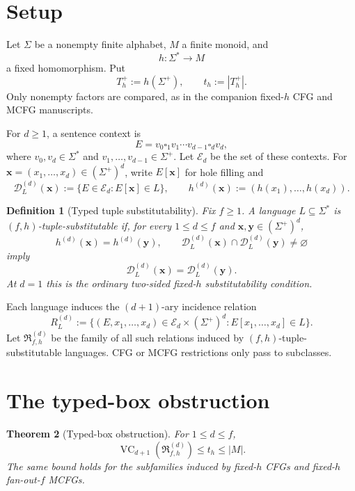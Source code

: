 \documentclass[11pt]{article}
\newtheorem{theorem}{Theorem}[section]
\newtheorem{definition}[theorem]{Definition}
\newcommand{\D}{\mathcal D}
\newcommand{\E}{\mathcal E}
\newcommand{\Rclass}{\mathfrak R}
\newcommand{\VC}{\operatorname{VC}}
\newcommand{\blank}{\square}
\begin{document}
\section{Setup}

Let \(\Sigma\) be a nonempty finite alphabet, \(M\) a finite monoid, and
\[
h:\Sigma^*\to M
\]
a fixed homomorphism. Put
\[
T_h^+:=h(\Sigma^+),\qquad t_h:=|T_h^+|.
\]
Only nonempty factors are compared, as in the companion fixed-\(h\) CFG and MCFG manuscripts.

For \(d\ge1\), a sentence context is
\[
E=v_0\blank_1v_1\cdots v_{d-1}\blank_dv_d,
\]
where \(v_0,v_d\in\Sigma^*\) and \(v_1,\ldots,v_{d-1}\in\Sigma^+\).
Let \(\E_d\) be the set of these contexts. For
\(\mathbf x=(x_1,\ldots,x_d)\in(\Sigma^+)^d\), write \(E[\mathbf x]\) for
hole filling and
\[
\D_L^{(d)}(\mathbf x):=\{E\in\E_d:E[\mathbf x]\in L\},\qquad
h^{(d)}(\mathbf x):=(h(x_1),\ldots,h(x_d)).
\]

\begin{definition}[Typed tuple substitutability]
Fix \(f\ge1\). A language \(L\subseteq\Sigma^*\) is
\emph{\((f,h)\)-tuple-substitutable} if, for every \(1\le d\le f\) and
\(\mathbf x,\mathbf y\in(\Sigma^+)^d\),
\[
h^{(d)}(\mathbf x)=h^{(d)}(\mathbf y),\qquad
\D_L^{(d)}(\mathbf x)\cap\D_L^{(d)}(\mathbf y)\ne\varnothing
\]
imply
\[
\D_L^{(d)}(\mathbf x)=\D_L^{(d)}(\mathbf y).
\]
At \(d=1\) this is the ordinary two-sided fixed-\(h\) substitutability condition.
\end{definition}

Each language induces the \((d+1)\)-ary incidence relation
\[
R_L^{(d)}
:=
\{(E,x_1,\ldots,x_d)\in\E_d\times(\Sigma^+)^d:
E[x_1,\ldots,x_d]\in L\}.
\]
Let \(\Rclass_{f,h}^{(d)}\) be the family of all such relations induced by
\((f,h)\)-tuple-substitutable languages. CFG or MCFG restrictions only pass
to subclasses.

\section{The typed-box obstruction}

\begin{theorem}[Typed-box obstruction]\label{thm:typed-box}
For \(1\le d\le f\),
\[
\VC_{d+1}\!\left(\Rclass_{f,h}^{(d)}\right)
\le t_h\le |M|.
\]
The same bound holds for the subfamilies induced by fixed-\(h\) CFGs and
fixed-\(h\) fan-out-\(f\) MCFGs.
\end{theorem}
\end{document}
